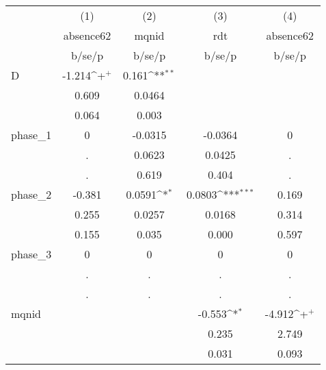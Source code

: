 {
\def\sym#1{\ifmmode^{#1}\else\(^{#1}\)\fi}
\begin{tabular}{l*{4}{c}}
\hline\hline
            &\multicolumn{1}{c}{(1)}&\multicolumn{1}{c}{(2)}&\multicolumn{1}{c}{(3)}&\multicolumn{1}{c}{(4)}\\
            &\multicolumn{1}{c}{absence62}&\multicolumn{1}{c}{mqnid}&\multicolumn{1}{c}{rdt}&\multicolumn{1}{c}{absence62}\\
            &      b/se/p         &      b/se/p         &      b/se/p         &      b/se/p         \\
\hline
D           &      -1.214\sym{+}  &       0.161\sym{**} &                     &                     \\
            &       0.609         &      0.0464         &                     &                     \\
            &       0.064         &       0.003         &                     &                     \\
phase\_1     &           0         &     -0.0315         &     -0.0364         &           0         \\
            &           .         &      0.0623         &      0.0425         &           .         \\
            &           .         &       0.619         &       0.404         &           .         \\
phase\_2     &      -0.381         &      0.0591\sym{*}  &      0.0803\sym{***}&       0.169         \\
            &       0.255         &      0.0257         &      0.0168         &       0.314         \\
            &       0.155         &       0.035         &       0.000         &       0.597         \\
phase\_3     &           0         &           0         &           0         &           0         \\
            &           .         &           .         &           .         &           .         \\
            &           .         &           .         &           .         &           .         \\
mqnid       &                     &                     &      -0.553\sym{*}  &      -4.912\sym{+}  \\
            &                     &                     &       0.235         &       2.749         \\
            &                     &                     &       0.031         &       0.093         \\

\end{tabular}}
